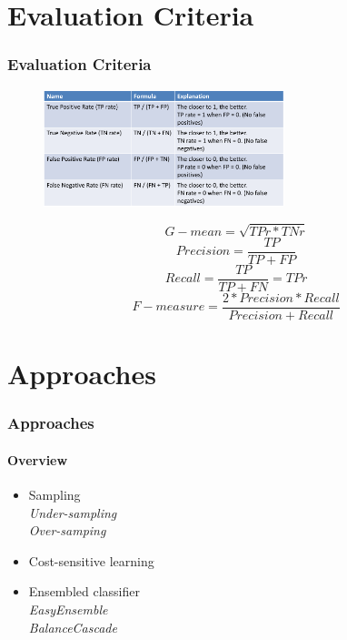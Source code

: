 \documentclass[11 pt,t]{beamer}
\begin{document}
\section{Evaluation Criteria}
\begin{frame}
\frametitle{Evaluation Criteria}

\begin{minipage}[t]{\linewidth}\centering
\begin{figure}
   \includegraphics[width=7cm]{rate}
\end{figure}
\end{minipage}
\begin{displaymath}
G-mean = \sqrt{TPr * TNr}
\end{displaymath}
\begin{displaymath}
Precision = \frac{TP}{TP+FP}
\end{displaymath}
\begin{displaymath}
Recall = \frac{TP}{TP+FN} = TPr
\end{displaymath}
\begin{displaymath}
F-measure = \frac{2*Precision*Recall}{Precision+Recall}
\end{displaymath}
\end{frame}

\section{Approaches}
\begin{frame}
\frametitle{Approaches}
\framesubtitle{Overview}
\begin{itemize}
\item Sampling\\
\emph{Under-sampling}\\
\emph{Over-samping}
\item Cost-sensitive learning
\item Ensembled classifier\\
\emph{EasyEnsemble}\\
\emph{BalanceCascade}
\end{itemize}
\end{frame}
\end{document}
